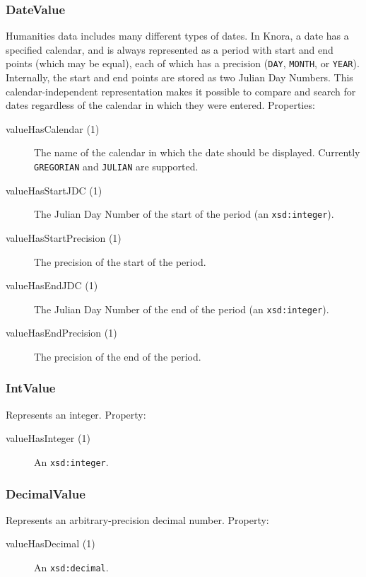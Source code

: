 \documentclass[12pt, a4paper]{article}
\begin{document}
\subsubsection{DateValue}

Humanities data includes many different types of dates. In Knora, a date has a specified calendar, and is always represented as a period with start and end points (which may be equal), each of which has a precision (\texttt{DAY}, \texttt{MONTH}, or \texttt{YEAR}). Internally, the start and end points are stored as two Julian Day Numbers. This calendar-independent representation makes it possible to compare and search for dates regardless of the calendar in which they were entered. Properties:

\begin{description}
	\item[valueHasCalendar (1)] The name of the calendar in which the date should be displayed. Currently \texttt{GREGORIAN} and \texttt{JULIAN} are supported.
	\item[valueHasStartJDC (1)] The Julian Day Number of the start of the period (an \texttt{xsd:integer}).
	\item[valueHasStartPrecision (1)] The precision of the start of the period.
	\item[valueHasEndJDC (1)] The Julian Day Number of the end of the period (an \texttt{xsd:integer}).
	\item[valueHasEndPrecision (1)] The precision of the end of the period.
\end{description}

\subsubsection{IntValue}

Represents an integer. Property:

\begin{description}
	\item[valueHasInteger (1)] An \texttt{xsd:integer}.
\end{description}

\subsubsection{DecimalValue}

Represents an arbitrary-precision decimal number. Property:

\begin{description}
	\item[valueHasDecimal (1)] An \texttt{xsd:decimal}.
\end{description}
\end{document}
